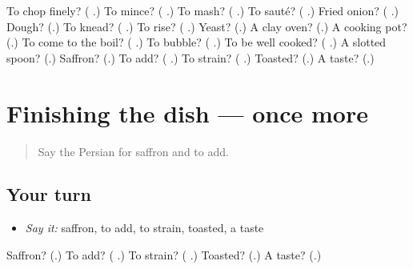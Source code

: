 \begin{tcolorbox}[breakable,colback=teal!4,colframe=teal!35!black,title={Before you move on}]
To chop finely? (\textbf{ }.) To mince? (\textbf{ }.) To mash? (\textbf{ }.) To sauté? (\textbf{ }.) Fried onion? (\textbf{ }.) Dough? (\textbf{}.) To knead? (\textbf{ }.) To rise? (\textbf{ }.) Yeast? (\textbf{}.) A clay oven? (\textbf{}.) A cooking pot? (\textbf{}.) To come to the boil? (\textbf{ }.) To bubble? (\textbf{ }.) To be well cooked? (\textbf{ }.) A slotted spoon? (\textbf{}.) Saffron? (\textbf{}.) To add? (\textbf{ }.) To strain? (\textbf{ }.) Toasted? (\textbf{}.) A taste? (\textbf{}.)
\end{tcolorbox}
\section[(dialogue)]{Finishing the dish — once more}

\label{lesson:FA-R359-review-final-359}



\begin{quote}
Say the Persian for saffron and to add.
\end{quote}

\subsection*{Your turn}
\begin{itemize}
\raggedright
  \item \emph{Say it:} saffron, to add, to strain, toasted, a taste
\end{itemize}

\begin{tcolorbox}[breakable,colback=teal!4,colframe=teal!35!black,title={Before you move on}]
Saffron? (\textbf{}.) To add? (\textbf{ }.) To strain? (\textbf{ }.) Toasted? (\textbf{}.) A taste? (\textbf{}.)
\end{tcolorbox}
